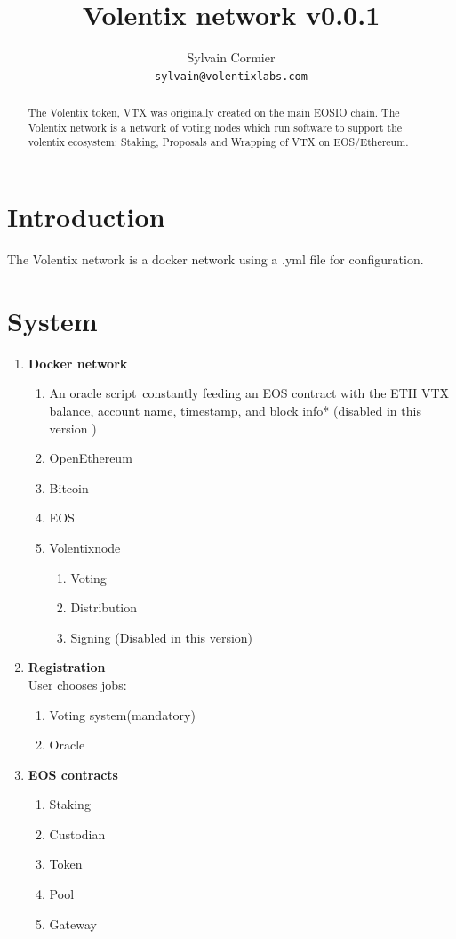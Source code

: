 \documentclass[]{article}
\title{Volentix network v0.0.1}
\author{
		Sylvain Cormier\\
	\texttt{sylvain@volentixlabs.com}
}
\begin{document}
\maketitle

\begin{abstract}

The Volentix token, VTX was originally created on the main EOSIO chain.
The Volentix network is a network of voting nodes which run software to support the volentix ecosystem:
Staking, Proposals and Wrapping of VTX on EOS/Ethereum. 

\end{abstract}

\section{Introduction }

	The Volentix network is a docker network using a .yml file for configuration.

\section{System}
\begin{enumerate}
	\item \textbf{Docker network } \\
	\begin{enumerate}
	\item An oracle script\
	constantly feeding an EOS contract with the ETH VTX balance, account name, timestamp, and block info* (disabled in this version ) 
	\item OpenEthereum
	\item Bitcoin
	\item EOS
	\item Volentixnode \
	\begin{enumerate}
		\item Voting
		\item Distribution
		\item Signing (Disabled in this version)
	\end{enumerate}
\end{enumerate}
		\item \textbf{Registration} \\
			User chooses jobs:
				\begin{enumerate}  
					\item Voting system(mandatory)
					\item Oracle
				\end{enumerate}
		\item \textbf{EOS contracts} \
		\begin{enumerate}  
			\item Staking
			\item Custodian
			\item Token
			\item Pool
			\item Gateway
		\end{enumerate}
		
\end{enumerate}
 
\end{document}
